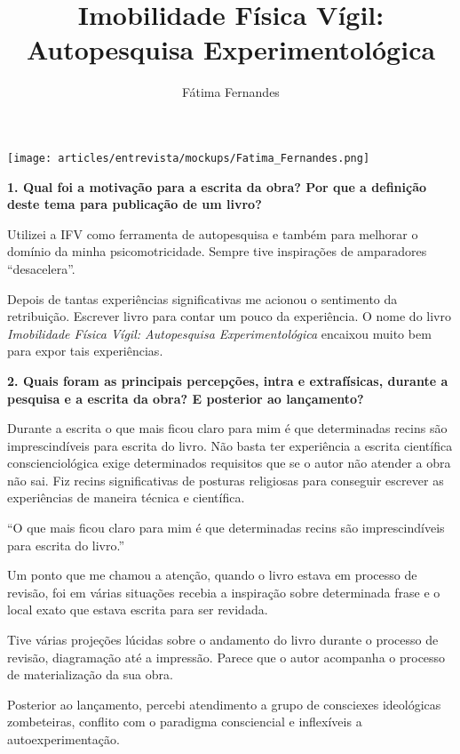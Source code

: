 \documentclass{gescons}
\author{Fátima Fernandes}
\title{Imobilidade Física Vígil: Autopesquisa Experimentológica}
\begin{document}
    \makeentrevistatitle

    \begin{multicols}{2}

\begin{center}
    \texttt{[image: articles/entrevista/mockups/Fatima\_Fernandes.png]}
\end{center}


\textbf{1. Qual foi a motivação para a escrita da obra? Por que a definição deste tema para publicação de um livro?}

Utilizei a IFV como ferramenta de autopesquisa e também para melhorar o domínio da minha psicomotricidade. Sempre tive inspirações de amparadores ``desacelera''.

Depois de tantas experiências significativas me acionou o sentimento da retribuição. Escrever livro para contar um pouco da experiência. O nome do livro \emph{Imobilidade Física Vígil: Autopesquisa Experimentológica} encaixou muito bem para expor tais experiências.


\textbf{2. Quais foram as principais percepções, intra e extrafísicas, durante a pesquisa e a escrita da obra? E posterior ao lançamento?}

Durante a escrita o que mais ficou claro para mim é que determinadas recins são imprescindíveis para escrita do livro. Não basta ter experiência a escrita científica conscienciológica exige determinados requisitos que se o autor não atender a obra não sai. Fiz recins significativas de posturas religiosas para conseguir escrever as experiências de maneira técnica e científica.

\begin{pullquote}
``O  que mais ficou claro para mim é que determinadas recins são imprescindíveis para escrita do livro.''
\end{pullquote}

Um ponto que me chamou a atenção, quando o livro estava em processo de revisão, foi em várias situações recebia a inspiração sobre determinada frase e o local exato que estava escrita para ser revidada.

Tive várias projeções lúcidas sobre o andamento do livro durante o processo de revisão, diagramação até a impressão. Parece que o autor acompanha o processo de materialização da sua obra.

Posterior ao lançamento, percebi atendimento a grupo de consciexes ideológicas zombeteiras, conflito com o paradigma consciencial e inflexíveis a autoexperimentação.


\end{multicols}
\end{document}
